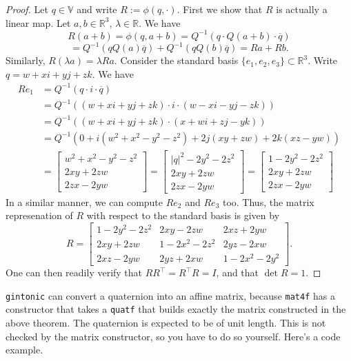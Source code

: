 \documentclass{article}
\begin{document}
\begin{proof}
Let $q \in \mathbb{V}$ and write $R := \phi(q, \cdot)$. First we show that $R$ is actually a linear map. Let $a,b \in \mathbb{R}^3$, $\lambda \in \mathbb{R}$. We have
\[ R(a+b) = \phi(q,a+b) = Q^{-1} \left( q \cdot Q(a+b) \cdot \overline{q} \right) \] \[= Q^{-1}\left( q Q(a) \overline{q} \right) + Q^{-1} \left( q Q(b) \overline{q} \right) = Ra + Rb. \]
Similarly, $R(\lambda a) = \lambda Ra$. Consider the standard basis $\{e_1,e_2,e_3\} \subset \mathbb{R}^3$. Write $q = w+xi+yj+zk$. We have
\begin{align*}
Re_1 &= Q^{-1} \left( q \cdot i \cdot \overline{q} \right) \\
&= Q^{-1} \left( \left(w+xi+yj+zk\right) \cdot i \cdot \left( w -xi-yj -zk \right) \right) \\
&= Q^{-1} \left( \left(w+xi+yj+zk\right) \cdot \left(x + wi +zj -yk\right) \right) \\
&= Q^{-1} \left(0 + i\left(w^2+x^2-y^2-z^2\right) + 2j\left(xy + zw\right) +2k\left(xz -yw\right)\right) \\
&= \begin{bmatrix} w^2+x^2-y^2-z^2 \\ 2xy +2zw \\ 2zx - 2yw \end{bmatrix} = \begin{bmatrix} |q|^2 -2y^2-2z^2 \\ 2xy +2zw \\ 2zx - 2yw \end{bmatrix} = \begin{bmatrix} 1-2y^2-2z^2 \\ 2xy +2zw \\ 2zx - 2yw \end{bmatrix}
\end{align*}
In a similar manner, we can compute $R e_2$ and $R e_3$ too. Thus, the matrix represenation of $R$ with respect to the standard basis is given by
\[ R = \begin{bmatrix}
1 - 2y^2 -2z^2 & 2xy - 2zw & 2xz + 2yw \\
2xy + 2zw & 1 - 2x^2 -2z^2 & 2yz -2xw \\
2xz -2yw & 2yz + 2xw & 1-2x^2 -2y^2
\end{bmatrix}. \]
One can then readily verify that $RR^\intercal = R^\intercal R = I$, and that $\det R = 1$.
\end{proof}
\texttt{gintonic} can convert a quaternion into an affine matrix, because \texttt{mat4f} has a constructor that takes a \texttt{quatf} that builds exactly the matrix constructed in the above theorem. The quaternion is expected to be of unit length. This is not checked by the matrix constructor, so you have to do so yourself. Here's a code example.
\end{document}
